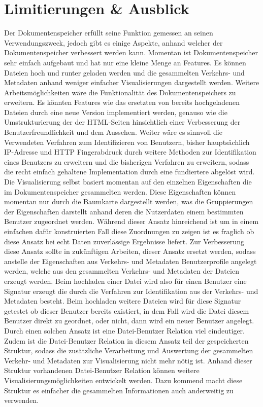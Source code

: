 \documentclass[
    fontsize=12pt,
    headings=small,
    parskip=half,           %
    bibliography=totoc,
    numbers=noenddot,       %
    open=any,               %
    ]{scrreprt}
\begin{document}
\section{Limitierungen \& Ausblick}
Der Dokumentenspeicher erfüllt seine Funktion gemessen an seinen Verwendungszweck, jedoch gibt es einige Aspekte, anhand welcher der Dokumentenspeicher verbessert werden kann.
Momentan ist Dokumentenspeicher sehr einfach aufgebaut und hat nur eine kleine Menge an Features.
Es können Dateien hoch und runter geladen werden und die gesammelten Verkehrs- und Metadaten anhand weniger einfacher Visualisierungen dargestellt werden.
Weitere Arbeitsmöglichkeiten wäre die Funktionalität des Dokumentenspeichers zu erweitern. 
Es könnten Features wie das ersetzten von bereits hochgeladenen Dateien durch eine neue Version implementiert werden, genauso wie die Umstrukturierung der der HTML-Seiten hinsichtlich einer Verbesserung der Benutzerfreundlichkeit und dem Aussehen.
Weiter wäre es sinnvoll die Verwendeten Verfahren zum Identifizieren von Benutzern, bisher hauptsächlich IP-Adresse und \ac{HTTP} Fingerabdruck durch weitere Methoden zur Identifikation eines Benutzers zu erweitern und die bisherigen Verfahren zu erweitern, sodass die recht einfach gehaltene Implementation durch eine fundiertere abgelöst wird.
Die Visualisierung selbst basiert momentan auf den einzelnen Eigenschaften die im Dokumentenspeicher gesammelten werden. 
Diese Eigenschaften können momentan nur durch die Baumkarte dargestellt werden, was die Gruppierungen der Eigenschaften darstellt anhand deren die Nutzerdaten einem bestimmten Benutzer zugeordnet werden. 
Während dieser Ansatz hinreichend ist um in einem einfachen dafür konstruierten Fall diese Zuordnungen zu zeigen ist es fraglich ob diese Ansatz bei echt Daten zuverlässige Ergebnisse liefert.
Zur Verbesserung diese Ansatz sollte in zukünftigen Arbeiten, dieser Ansatz ersetzt werden, sodass anstelle der Eigenschaften aus Verkehrs- und Metadaten Benutzerprofile angelegt werden, welche aus den gesammelten Verkehrs- und Metadaten der Dateien erzeugt werden. 
Beim hochladen einer Datei wird also für einen Benutzer eine Signatur erzeugt die durch die Verfahren zur Identifikation aus der Verkehrs- und Metadaten besteht. 
Beim hochladen weitere Dateien wird für diese Signatur getestet ob dieser Benutzer bereits existiert, in dem Fall wird die Datei diesem Benutzer direkt zu geordnet, oder nicht, dann wird ein neuer Benutzer angelegt.
Durch einen solchen Ansatz ist eine Datei-Benutzer Relation viel eindeutiger.
Zudem ist die Datei-Benutzer Relation in diesem Ansatz teil der gespeicherten Struktur, sodass die zusätzliche Verarbeitung und Auswertung der gesammelten Verkehr- und Metadaten zur Visualisierung nicht mehr nötig ist.
Anhand dieser Struktur vorhandenen Datei-Benutzer Relation können weitere Visualisierungsmöglichkeiten entwickelt werden. 
Dazu kommend macht diese Struktur es einfacher die gesammelten Informationen auch anderweitig zu verwenden. 
\end{document}
